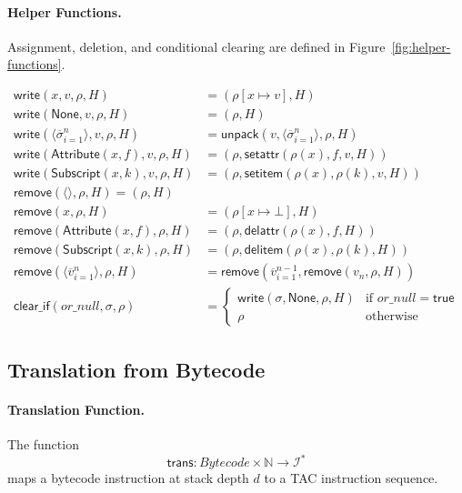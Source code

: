 \paragraph{Helper Functions.}
Assignment, deletion, and conditional clearing are defined in Figure~\ref{fig:helper-functions}.

\begin{figure*}[t]
\centering
\[
\begin{aligned}
\mathsf{write}(x,v,\rho,H) &= (\rho[x \mapsto v],H) \\
\mathsf{write}(\mathsf{None},v,\rho,H) &= (\rho,H) \\
\mathsf{write}(\langle\overline{\sigma}_{i=1}^{n}\rangle,v,\rho,H) &= \mathsf{unpack}(v,\langle\overline{\sigma}_{i=1}^{n}\rangle,\rho,H) \\
\mathsf{write}(\mathsf{Attribute}(x,f),v,\rho,H) &= (\rho,\mathsf{setattr}(\rho(x),f,v,H)) \\
\mathsf{write}(\mathsf{Subscript}(x,k),v,\rho,H) &= (\rho,\mathsf{setitem}(\rho(x),\rho(k),v,H)) \\[1ex]
\mathsf{remove}(\langle\rangle, \rho, H) = (\rho, H) \\
\mathsf{remove}(x,\rho,H) &= (\rho[x\mapsto \bot],H) \\
\mathsf{remove}(\mathsf{Attribute}(x,f),\rho,H) &= (\rho,\mathsf{delattr}(\rho(x),f,H)) \\
\mathsf{remove}(\mathsf{Subscript}(x,k),\rho,H) &= (\rho,\mathsf{delitem}(\rho(x),\rho(k),H)) \\
\mathsf{remove}(\langle\overline{v}_{i=1}^{n}\rangle,\rho,H) &= \mathsf{remove}(\overline{v}_{i=1}^{n-1},\mathsf{remove}(v_n,\rho,H)) \\[1ex]
\mathsf{clear\_if}(or\_null,\sigma,\rho) &=
\begin{cases}
\mathsf{write}(\sigma,\mathsf{None},\rho,H) & \text{if } or\_null = \mathsf{true} \\
\rho & \text{otherwise}
\end{cases}
\end{aligned}
\]
\caption{Helper Functions for Assignment and Deletion}
\label{fig:helper-functions}
\end{figure*}
\subsection{Translation from Bytecode}
\label{sec:translation}

\paragraph{Translation Function.}
The function
\[
\mathsf{trans} : Bytecode \times \mathbb{N} \to \mathcal{I}^*
\]
maps a bytecode instruction at stack depth $d$ to a TAC instruction sequence.

